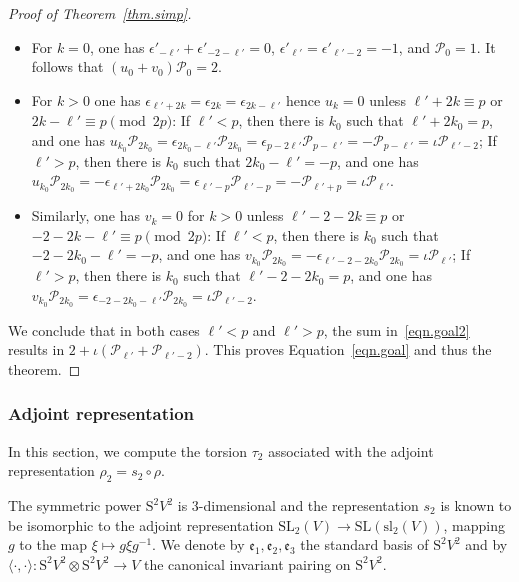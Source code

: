 \documentclass{amsart}
\newcommand{\SL}{\mathrm{SL}}
\renewcommand{\sl}{\mathrm{sl}}
\renewcommand{\S}{\mathrm{S}}
\def\calP{\mathcal{P}}
\theoremstyle{definition}
\begin{document}
\begin{proof}[Proof of Theorem~\ref{thm.simp}]
\begin{itemize}[leftmargin=*]
    \item For $k=0$, one has $\epsilon'_{-\ell'} + \epsilon'_{-2-\ell'}=0$, $\epsilon'_{\ell'}=\epsilon'_{\ell'-2}=-1$, and $\calP_0=1$. It follows that  $(u_0+v_0)\calP_0=2$.
    \item For $k>0$ one has $\epsilon_{\ell'+2k}=\epsilon_{2k}=\epsilon_{2k-\ell'}$ hence $u_k=0$ unless $\ell'+2k \equiv p$ or $2k-\ell'\equiv p\pmod{2p}$: 
    \subitem If $\ell'<p$, then there is $k_0$ such that $\ell'+2k_0=p$, and one has $u_{k_0}\calP_{2k_0}=\epsilon_{2k_0-\ell'}\calP_{2k_0}=\epsilon_{p-2\ell'}\calP_{p-\ell'}=-\calP_{p-\ell'}=\iota \calP_{\ell'-2}$;
    \subitem If $\ell'>p$, then there is $k_0$ such that $2k_0-\ell'=-p$, and one has $u_{k_0} \calP_{2k_0}=-\epsilon_{\ell'+2k_0} \calP_{2k_0}=\epsilon_{\ell'-p}\calP_{\ell'-p}=-\calP_{\ell'+p}=\iota \calP_{\ell'}$.
    \item Similarly, one has $v_k=0$ for $k>0$ unless  $\ell'-2-2k \equiv p$ or $-2-2k -\ell'\equiv p \pmod{2p}$: 
    \subitem If $\ell'<p$, then there is $k_0$ such that $-2-2k_0-\ell'=-p$, and one has $v_{k_0} \calP_{2k_0}=-\epsilon_{\ell'-2-2k_0}\calP_{2k_0}=\iota \calP_{\ell'}$;
    \subitem  If $\ell'>p$, then there is $k_0$ such that $\ell'-2-2k_0=p$, and one has  $v_{k_0} \calP_{2k_0}=\epsilon_{-2-2k_0-\ell'}\calP_{2k_0}=\iota \calP_{\ell'-2}$. 
\end{itemize}
We conclude that in both cases $\ell'<p$ and $\ell'>p$, the sum in~\eqref{eqn.goal2} results in $2+\iota(\calP_{\ell'}+\calP_{\ell'-2})$. This proves Equation~\eqref{eqn.goal} and thus the theorem.
\end{proof}


\subsubsection{Adjoint representation}

In this section, we compute the torsion $\tau_2$ associated with the adjoint representation $\rho_2 = s_2 \circ \rho$.

The symmetric power $\S^2V^2$ is 3-dimensional and the representation $s_2$ is known to be isomorphic to the adjoint representation $\SL_2(V)\to \SL(\sl_2(V))$, mapping $g$ to the map $\xi\mapsto g\xi g^{-1}$. 
We denote by $\mathfrak{e}_1, \mathfrak{e}_2,\mathfrak{e}_3$ the standard basis of $\S^2V^2$ and by $\langle \cdot, \cdot \rangle : \S^2V^2 \otimes \S^2V^2 \rightarrow V$ the canonical invariant pairing on $\S^2V^2$.
\end{document}
